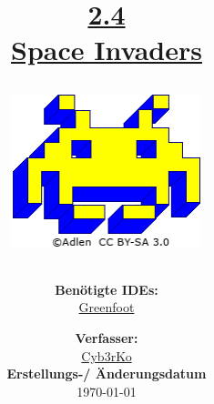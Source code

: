 \documentclass{scrartcl}   %
\begin{document}
\title{\huge{\href{https://www.inf-schule.de/programmierung/oopjava/implementierung/spaceinvaders}{2.4\\Space Invaders}}\\
\vspace{0.5cm}
\begin{figure}[ht]
	\centering
	\href{https://creativecommons.org/licenses/by-sa/3.0/de/}{\includegraphics[height=4.5cm]{Space_Invaders.png}}
\end{figure}
\vspace{2cm}}

\author{\textbf{Benötigte IDEs:}\\
\href{https://www.greenfoot.org/}{Greenfoot}
\vspace{2cm}}

\date{\textbf{Verfasser:}\\
\href{https://nikothegreek.jimdofree.com/}{Cyb3rKo}\\
\vspace{0.5cm}
\textbf{Erstellungs-/ Änderungsdatum}\\
\today\enlargethispage{4cm}}

\doublespacing

\maketitle\thispagestyle{empty}

\cleardoublepage

\setcounter{page}{1}
\tableofcontents


\newpage
{}  %
\end{document}

